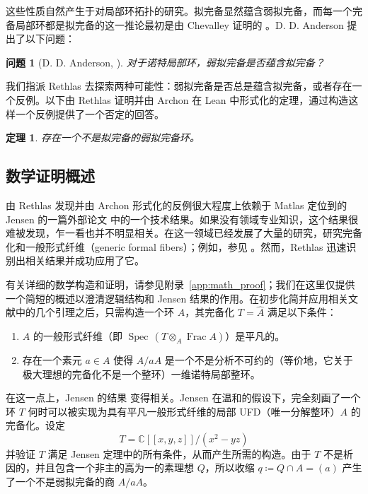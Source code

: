 ﻿\documentclass[]{pkuai4m}
\theoremstyle{plain}
\newtheorem{theorem}{定理}
\newtheorem*{problem*}{问题}
\theoremstyle{definition}
\begin{document}
这些性质自然产生于对局部环拓扑的研究。拟完备显然蕴含弱拟完备，而每一个完备局部环都是拟完备的这一推论最初是由 Chevalley 证明的 \cite[Lemma 7]{chevalley1943theory}。D. D. Anderson 提出了以下问题：

\begin{problem*}[{D. D. Anderson, \cite[Problem 8a]{cahen2014open}}]
对于诺特局部环，弱拟完备是否蕴含拟完备？
\end{problem*}

我们指派 Rethlas 去探索两种可能性：弱拟完备是否总是蕴含拟完备，或者存在一个反例。以下由 Rethlas 证明并由 Archon 在 Lean 中形式化的定理，通过构造这样一个反例提供了一个否定的回答。

\begin{theorem}\label{thm:main}
    存在一个不是拟完备的弱拟完备环。
\end{theorem}

\subsection{数学证明概述}\label{subsec:nl_proof_sketch}


由 Rethlas 发现并由 Archon 形式化的反例很大程度上依赖于 Matlas 定位到的 Jensen 的一篇外部论文 \cite{jensen2006completions} 中的一个技术结果。如果没有领域专业知识，这个结果很难被发现，乍一看也并不明显相关。在这一领域已经发展了大量的研究，研究完备化和一般形式纤维（generic formal fibers）；例如，参见 \cite{heitmann1993characterization, loepp1997constructing, jensen2006completions, fleming2019completely}。然而，Rethlas 迅速识别出相关结果并成功应用了它。

有关详细的数学构造和证明，请参见附录~\ref{app:math_proof}；我们在这里仅提供一个简短的概述以澄清逻辑结构和 Jensen 结果的作用。在初步化简并应用相关文献中的几个引理之后，只需构造一个环 \(A\)，其完备化 \(T = \widehat A\) 满足以下条件：
\begin{enumerate}[leftmargin=*]
\item[A.] \(A\) 的一般形式纤维（即 \(\operatorname{Spec}\, (T \otimes_{A} \operatorname{Frac} A)\)）是平凡的。
\item[B.] 存在一个素元 \(a \in A\) 使得 \(A/aA\) 是一个不是分析不可约的（等价地，它关于极大理想的完备化不是一个整环）一维诺特局部整环。
\end{enumerate}

在这一点上，Jensen 的结果 \cite[Corollary 2.4]{jensen2006completions} 变得相关。Jensen 在温和的假设下，完全刻画了一个环 \(T\) 何时可以被实现为具有平凡一般形式纤维的局部 UFD（唯一分解整环）\(A\) 的完备化。设定
\[
T = \mathbb{C}[[x,y,z]]/(x^2 - yz)
\]
并验证 \(T\) 满足 Jensen 定理中的所有条件，从而产生所需的构造。由于 \(T\) 不是析因的，并且包含一个非主的高为一的素理想 \(Q\)，所以收缩 $q \coloneqq Q \cap A = (a)$ 产生了一个不是弱拟完备的商 \(A/aA\)。
\end{document}
